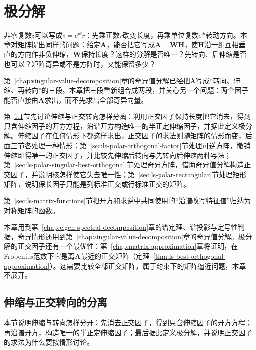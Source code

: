 
\chapter{极分解}
\label{sec:ls-polar-decomposition}
\label{chap:polar-decomposition}

非零复数$z$可以写成$z=e^{\mathrm i\theta}r$：先乘正数$r$改变长度，再乘单位复数$e^{\mathrm i\theta}$转动方向。本章对矩阵提出同样的问题：给定$\bm A$，能否把它写成$\bm A=\bm W\bm H$，使$\bm H$沿一组互相垂直的方向作非负伸缩，$\bm W$保持长度？这样的分解是否唯一？先转向、后伸缩是否也可以？矩阵奇异或不是方阵时，又能保留多少？

第~\ref{chap:singular-value-decomposition}章的奇异值分解已经把$\bm A$写成“转向、伸缩、再转向”的三段。本章把三段重新组合成两段，并关心另一个问题：两个因子能否直接由$\bm A$求出，而不先求出全部奇异向量。

第~\ref{sec:ls-polar-square-root-equation}节先讨论伸缩与正交转向怎样分离：利用正交因子保持长度把它消去，得到只含伸缩因子的开方方程，沿谱开方构造唯一的半正定伸缩因子，并据此定义极分解。伸缩因子在任何情形下都这样求出，正交因子的求法则随矩阵的情形而变，后面三节各处理一种情形：第~\ref{sec:ls-polar-orthogonal-factor}节处理可逆方阵，撤销伸缩即得唯一的正交因子，并比较先伸缩后转向与先转向后伸缩两种写法；第~\ref{sec:ls-polar-singular-best-orthogonal}节处理奇异方阵，借助奇异值分解构造正交因子，并说明核怎样使它失去唯一性；第~\ref{sec:ls-polar-rectangular}节处理矩形矩阵，说明保长因子只能是列标准正交或行标准正交的矩阵。

第~\ref{sec:ls-matrix-functions}节把开方和求逆中共同使用的“沿谱改写特征值”归纳为对称矩阵的函数。

本章用到第~\ref{chap:eigen-spectral-decomposition}章的谱定理、谱投影与定号性判据，奇异情形还用到第~\ref{chap:singular-value-decomposition}章的奇异值分解。极分解的正交因子还有一个最优性：第~\ref{chap:matrix-approximation}章将证明，在Frobenius范数下它是离$\bm A$最近的正交矩阵（定理~\ref{thm:ls-best-orthogonal-approximation}）。这需要比较全部正交矩阵，属于约束下的矩阵逼近问题，本章不展开。

\section{伸缩与正交转向的分离}
\label{sec:ls-polar-square-root-equation}

本节说明伸缩与转向怎样分开：先消去正交因子，得到只含伸缩因子的开方方程；再沿谱开方，构造唯一的半正定伸缩因子；最后据此定义极分解，并说明正交因子的求法为什么要按情形讨论。


